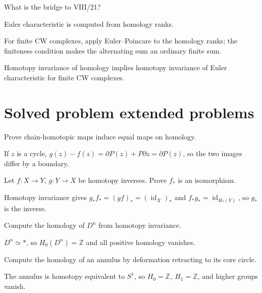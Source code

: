 \begin{exercise}\label{exr:viii20-24}
What is the bridge to VIII/21?
\end{exercise}
\begin{hint}
Euler characteristic is computed from homology ranks.

For finite CW complexes, apply Euler--Poincare to the homology ranks; the finiteness condition makes the alternating sum an ordinary finite sum.
\end{hint}
\begin{solution}
Homotopy invariance of homology implies homotopy invariance of Euler characteristic for finite CW complexes.
\end{solution}


\section{Solved problem extended problems}

\begin{problem}\label{prob:viii20-01}
Prove chain-homotopic maps induce equal maps on homology.
\end{problem}
\begin{solution}
If \(z\) is a cycle, \(g(z)-f(z)=\partial P(z)+P\partial z=\partial P(z)\), so the two images differ by a boundary.
\end{solution}

\begin{problem}\label{prob:viii20-02}
Let \(f:X\to Y\), \(g:Y\to X\) be homotopy inverses. Prove \(f_*\) is an isomorphism.
\end{problem}
\begin{solution}
Homotopy invariance gives \(g_*f_*=(gf)_*=(\operatorname{id}_X)_*\) and \(f_*g_*=\operatorname{id}_{H_*(Y)}\), so \(g_*\) is the inverse.
\end{solution}

\begin{problem}\label{prob:viii20-03}
Compute the homology of \(D^n\) from homotopy invariance.
\end{problem}
\begin{solution}
\(D^n\simeq *\), so \(H_0(D^n)=\mathbb Z\) and all positive homology vanishes.
\end{solution}

\begin{problem}\label{prob:viii20-04}
Compute the homology of an annulus by deformation retracting to its core circle.
\end{problem}
\begin{solution}
The annulus is homotopy equivalent to \(S^1\), so \(H_0=\mathbb Z,\ H_1=\mathbb Z\), and higher groups vanish.
\end{solution}

